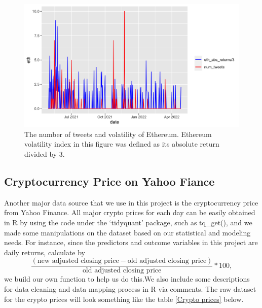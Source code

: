 \documentclass{article}
\begin{document}
\begin{figure}[H]
	\centering
	\includegraphics[width=16cm]{../figures/tweets_and_returns.png}
	\caption{The number of tweets and volatility of Ethereum. Ethereum volatility index in this figure was defined as its absolute return divided by 3. }
	\label{fig: tweets_and_returns}
\end{figure}

\subsection{Cryptocurrency Price on Yahoo Fiance}
Another major data source that we use in this project is the cryptocurrency price from Yahoo Finance. All major crypto prices for each day can be easily obtained in R by using the code under the ‘tidyquant’ package, such as tq\_get(), and we made some manipulations on the dataset based on our statistical and modeling needs. For instance, since the predictors and outcome variables in this project are daily returns, calculate by $$\frac{(\text{new adjusted closing price} - \text{old adjusted closing price})}{\text{old adjusted closing price} }*100,$$ we build our own function to help us do this.We also include some descriptions for data cleaning and data mapping process in R via comments. The raw dataset for the crypto prices will look something like the table \ref{Crypto prices} below.
\end{document}
